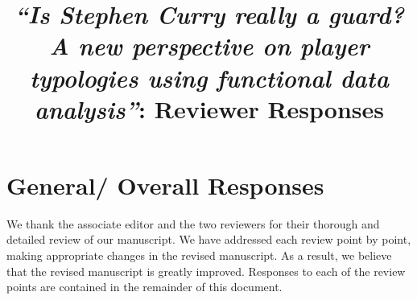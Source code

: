 \documentclass[12pt,a4paper]{article}
\title{\vspace{-1cm}
\begin{flushleft} {\sffamily \emph{``Is Stephen Curry really a guard? A new perspective on player typologies using functional data analysis''}: Reviewer Responses}\end{flushleft}}
\date{\vspace{-1.7cm}\begin{flushleft}\sffamily 
\end{flushleft}}
\begin{document}
\maketitle

\section*{General/ Overall Responses}

We thank the associate editor and the two reviewers for their thorough and detailed review of our manuscript.
We have addressed each review point by point, making appropriate changes in the revised manuscript.
As a result, we believe that the revised manuscript is greatly improved.
Responses to each of the review points are contained in the remainder of this document.






\printbibliography
\end{document}
